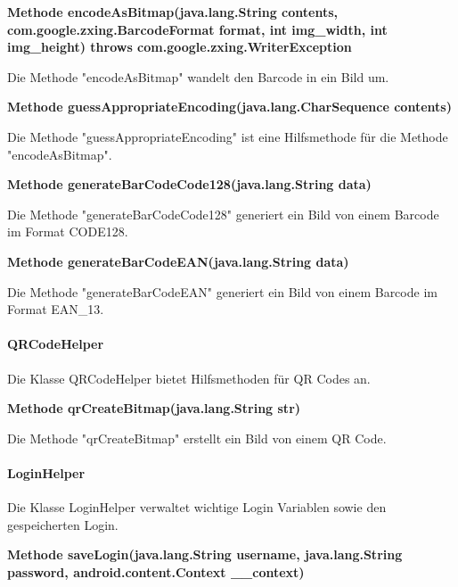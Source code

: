 \documentclass{scrartcl}
\begin{document}
\noindent\textbf{Methode encodeAsBitmap(java.lang.String contents, \newline          com.google.zxing.BarcodeFormat format, int img\_width, int img\_height) \newline 
throws com.google.zxing.WriterException}

\noindent Die Methode "encodeAsBitmap" wandelt den Barcode in ein Bild um. \newline 

\noindent\textbf{Methode guessAppropriateEncoding(java.lang.CharSequence contents)}

\noindent Die Methode "guessAppropriateEncoding" ist eine Hilfsmethode für die Methode "encodeAsBitmap". \newline 

\noindent\textbf{Methode generateBarCodeCode128(java.lang.String data)}

\noindent Die Methode "generateBarCodeCode128" generiert ein Bild von einem Barcode im Format CODE128. \newline 

\noindent\textbf{Methode generateBarCodeEAN(java.lang.String data)}

\noindent Die Methode "generateBarCodeEAN" generiert ein Bild von einem Barcode im Format EAN\_13. \newline 


\paragraph{QRCodeHelper}
Die Klasse QRCodeHelper bietet Hilfsmethoden für QR Codes an. \newline 

\noindent\textbf{Methode qrCreateBitmap(java.lang.String str)}

\noindent Die Methode "qrCreateBitmap" erstellt ein Bild von einem QR Code. \newline 

\paragraph{LoginHelper}
Die Klasse LoginHelper verwaltet wichtige Login Variablen sowie den gespeicherten Login. \newline 

\noindent\textbf{Methode saveLogin(java.lang.String username, \newline                      java.lang.String password, android.content.Context \_\_context)}
\end{document}
